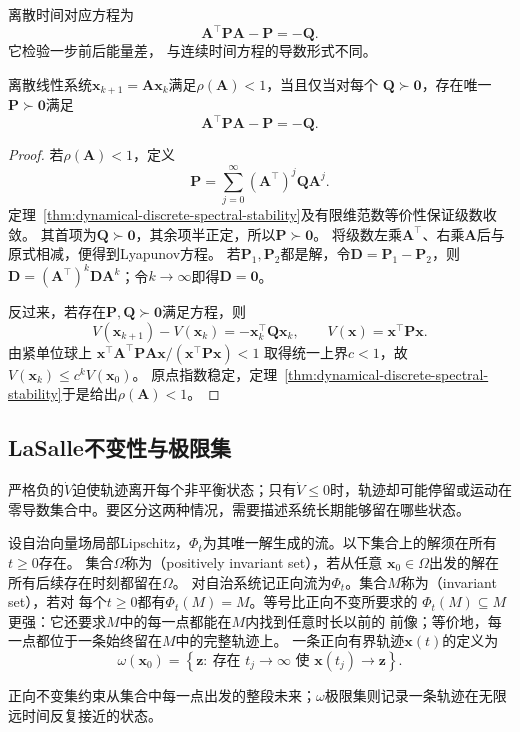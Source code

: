 离散时间对应方程为
\[
	\bm{A}^{\top}\bm{P}\bm{A}-\bm{P}= -\bm{Q}.
\]
它检验一步前后能量差， 与连续时间方程的导数形式不同。

\begin{theorem}[离散时间Lyapunov方程]
	\label{thm:dynamical-discrete-lyapunov-equation}
	离散线性系统$\bm{x}_{k+1}=\bm{A}\bm{x}_k$满足$\rho(\bm{A})<1$，当且仅当对每个
	$\bm{Q}\succ\bm{0}$，存在唯一$\bm{P}\succ\bm{0}$满足
	\[
		\bm{A}^{\top}\bm{P}\bm{A}-\bm{P}=-\bm{Q}.
	\]
\end{theorem}

\begin{proof}
	若$\rho(\bm{A})<1$，定义
	\[
		\bm{P}=\sum_{j=0}^{\infty}(\bm{A}^{\top})^j\bm{Q}\bm{A}^j.
	\]
	定理~\ref{thm:dynamical-discrete-spectral-stability}及有限维范数等价性保证级数收敛。
	其首项为$\bm{Q}\succ\bm{0}$，其余项半正定，所以$\bm{P}\succ\bm{0}$。
	将级数左乘$\bm{A}^{\top}$、右乘$\bm{A}$后与原式相减，便得到Lyapunov方程。
	若$\bm{P}_1,\bm{P}_2$都是解，令$\bm{D}=\bm{P}_1-\bm{P}_2$，则
	$\bm{D}=(\bm{A}^{\top})^k\bm{D}\bm{A}^k$；令$k\to\infty$即得$\bm{D}=\bm{0}$。

	反过来，若存在$\bm{P},\bm{Q}\succ\bm{0}$满足方程，则
	\[
		V(\bm{x}_{k+1})-V(\bm{x}_k)
		=-\bm{x}_k^{\top}\bm{Q}\bm{x}_k,
		\qquad V(\bm{x})=\bm{x}^{\top}\bm{P}\bm{x}.
	\]
	由紧单位球上
	$\bm{x}^{\top}\bm{A}^{\top}\bm{P}\bm{A}\bm{x}/(\bm{x}^{\top}\bm{P}\bm{x})<1$
	取得统一上界$c<1$，故$V(\bm{x}_k)\leq c^kV(\bm{x}_0)$。
	原点指数稳定，定理~\ref{thm:dynamical-discrete-spectral-stability}于是给出$\rho(\bm{A})<1$。
\end{proof}

\subsection{LaSalle不变性与极限集}

严格负的$\dot V$迫使轨迹离开每个非平衡状态；只有$\dot V\leq0$时，轨迹却可能停留或运动在
零导数集合中。要区分这两种情况，需要描述系统长期能够留在哪些状态。
\begin{definition}[不变集合与轨迹极限集]
\label{def:dynamical-invariant-limit-sets}
设自治向量场局部Lipschitz，$\Phi_t$为其唯一解生成的流。以下集合上的解须在所有$t\geq0$存在。
集合$\Omega$称为（positively invariant set），若从任意
$\bm{x}_0\in\Omega$出发的解在所有后续存在时刻都留在$\Omega$。
对自治系统记正向流为$\Phi_t$。集合$M$称为（invariant set），若对
每个$t\geq0$都有$\Phi_t(M)=M$。等号比正向不变所要求的
$\Phi_t(M)\subseteq M$更强：它还要求$M$中的每一点都能在$M$内找到任意时长以前的
前像；等价地，每一点都位于一条始终留在$M$中的完整轨迹上。
一条正向有界轨迹$\bm{x}(t)$的定义为
\[
	\omega(\bm{x}_0)
	=\left\{\bm{z}:\ \text{存在 }t_j\to\infty
	\text{ 使 }\bm{x}(t_j)\to\bm{z}\right\}.
\]
\end{definition}
正向不变集约束从集合中每一点出发的整段未来；$\omega$极限集则记录一条轨迹在无限远时间反复接近的状态。

